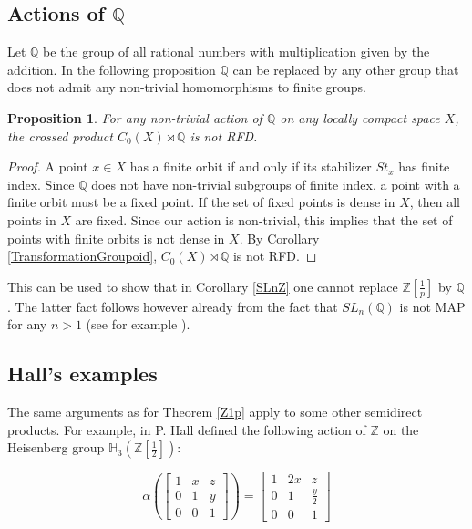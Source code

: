 \documentclass[11 pt, leqno, hidelinks]{amsart}%
\theoremstyle{plain}
\newtheorem{proposition}[theorem]{Proposition}
\numberwithin{equation}{section}
\begin{document}
\subsection{Actions of $\mathbb Q$}

Let  $\mathbb Q$  be the group of all rational numbers with multiplication given by the addition. In the following proposition $\mathbb Q$ can be replaced by any other group that does not admit any  non-trivial homomorphisms to finite groups.

\begin{proposition}\label{Q} For any non-trivial action of $\mathbb Q$ on any locally compact space $X$, the crossed product $C_0(X)\rtimes \mathbb Q$ is not RFD.
\end{proposition}
\begin{proof} A point $x\in X$ has  a finite orbit if and only if its stabilizer  $St_x$ has finite index. Since $\mathbb Q$ does not have non-trivial subgroups of finite index, a point with a finite orbit must be a fixed point. If the set of fixed points is dense in $X$, then all points in $X$ are fixed. Since our action is non-trivial, this implies that the set of points with finite orbits is not dense in $X$. By Corollary \ref{TransformationGroupoid},  $C_0(X)\rtimes \mathbb Q$ is not RFD.
\end{proof}

\medskip

This can be used to show that in Corollary \ref{SLnZ} one cannot replace $\mathbb Z[\frac{1}{p}]$ by  $\mathbb Q$. The latter fact follows however already from the fact that  $SL_n(\mathbb Q)$ is not  MAP   for any $n>1$ (see for example \cite[Proposition 4.C.20]{BookUnitaryDual}).


\bigskip

\subsection{Hall's examples}

The same arguments as for Theorem \ref{Z1p} apply to some other semidirect products. For example, in \cite[p. 349]{Hall}  P.
Hall defined the following action of $\mathbb Z$ on  the Heisenberg group $\mathbb H_3\left(\mathbb Z[\frac{1}{2}]\right)$:


\begin{equation*}
\alpha\left( \left[ \begin{array}{ccc} 1 & x & z\\ 0 & 1 & y\\ 0 & 0 & 1 \end{array}  \right]  \right)=\left[ \begin{array}{ccc} 1 & 2x & z\\ 0 & 1 & \frac{y}{2}\\ 0 & 0 & 1 \end{array}  \right]
\end{equation*}
\end{document}
